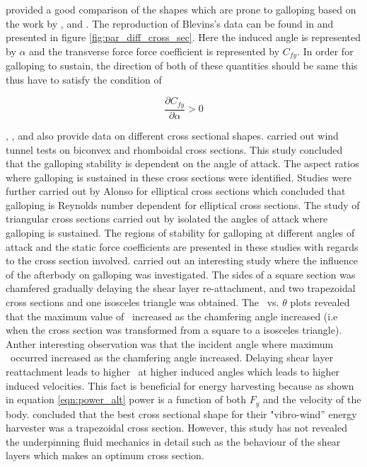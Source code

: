 \citet{Blevins1990} provided a good comparison of the shapes which are prone to galloping based on the work by \citet{Parkinson1961}, \citet{Nakamura1975a} and \citet{Nakamura1977}. The reproduction of Blevins's data can be found in \citet{Paidoussis2010} and presented in figure \ref{fig:par_diff_cross_sec}. Here the induced angle is represented by $\alpha$ and the transverse force force coefficient is represented by $C_{fy}$. In order for galloping to sustain, the direction of both of these quantities should be same this thus have to satisfy the condition of 

\begin{equation}
\frac{\partial C_{fy}}{\partial \alpha } >0
\end{equation}  
    
 
 
 
\citet{Naudascher1993}, \citet{Ruscheweyh1996}, \citet{Deniz1997} and \citet{Weaver2005} also provide data on different cross sectional shapes. \citet{Alonso2009} carried out wind tunnel tests on biconvex and rhomboidal cross sections. This study concluded that the galloping stability is dependent on the angle of attack. The aspect ratios where galloping is sustained in these cross sections were identified. Studies were further carried out by Alonso for elliptical cross sections \citep{Alonso2010} which concluded that galloping is Reynolds number dependent for elliptical cross sections. The study of triangular cross sections carried out by \citep{Alonso2005} isolated the angles of attack where galloping is sustained. The regions of stability for galloping at different angles of attack and the static force coefficients are presented in these studies with regards to the cross section involved. \citet{Luo1994} carried out an interesting study where the influence of the afterbody on galloping was investigated. The sides of a square section was chamfered gradually delaying the shear layer re-attachment, and two trapezoidal cross sections and one isosceles triangle was obtained. The \cy\ vs. $\theta$ plots revealed that the maximum value of \cy\ increased as the chamfering angle increased (i.e when the cross section was transformed from a square to a isosceles triangle). Anther interesting observation was that the incident angle where maximum \cy\ occurred increased as the chamfering angle increased. Delaying shear layer reattachment leads to higher \cy\ at higher induced angles which leads to higher induced velocities. This fact is beneficial for energy harvesting because as shown in equation \ref{eqn:power_alt} power is a function of both $F_{y}$ and the velocity of the body. \citep{Kluger2013} concluded that the best cross sectional shape for their "vibro-wind'' energy harvester was a trapezoidal cross section. However, this study has not revealed the underpinning fluid mechanics in detail such as the behaviour of the shear layers which makes an optimum cross section.

